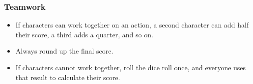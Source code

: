 \subsubsection{Teamwork}

\begin{itemize}
  \item
  If characters can work together on an action, a second character can add half their score, a third adds a quarter, and so on.
  \item
  Always round up the final score.
  \item
  If characters cannot work together, roll the dice roll once, and everyone uses that result to calculate their score.
\end{itemize}
